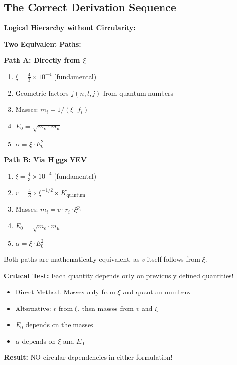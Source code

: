 \documentclass[12pt,a4paper]{article}
\newcommand{\xipar}{\xi}
\newcommand{\Ezero}{E_0}
\newcommand{\Kquantum}{K_{\text{quantum}}}
\begin{document}
	\subsection{The Correct Derivation Sequence}
	
	\begin{result}
		\textbf{Logical Hierarchy without Circularity:}
		
		\textbf{Two Equivalent Paths:}
		
		\textbf{Path A: Directly from $\xi$}
		\begin{enumerate}
			\item $\xipar = \frac{4}{3} \times 10^{-4}$ (fundamental)
			\item Geometric factors $f(n,l,j)$ from quantum numbers
			\item Masses: $m_i = 1/(\xi \cdot f_i)$
			\item $\Ezero = \sqrt{m_e \cdot m_\mu}$
			\item $\alpha = \xipar \cdot \Ezero^2$
		\end{enumerate}
		
		\textbf{Path B: Via Higgs VEV}
		\begin{enumerate}
			\item $\xipar = \frac{4}{3} \times 10^{-4}$ (fundamental)
			\item $v = \frac{4}{3} \times \xipar^{-1/2} \times \Kquantum$
			\item Masses: $m_i = v \cdot r_i \cdot \xipar^{p_i}$
			\item $\Ezero = \sqrt{m_e \cdot m_\mu}$
			\item $\alpha = \xipar \cdot \Ezero^2$
		\end{enumerate}
		
		Both paths are mathematically equivalent, as $v$ itself follows from $\xi$.
		
		\textbf{Critical Test:} Each quantity depends only on previously defined quantities!
		\begin{itemize}
			\item Direct Method: Masses only from $\xipar$ and quantum numbers \checkmark
			\item Alternative: $v$ from $\xipar$, then masses from $v$ and $\xipar$ \checkmark
			\item $\Ezero$ depends on the masses \checkmark
			\item $\alpha$ depends on $\xipar$ and $\Ezero$ \checkmark
		\end{itemize}
		
		\textbf{Result:} NO circular dependencies in either formulation!
	\end{result}
	
\end{document}
